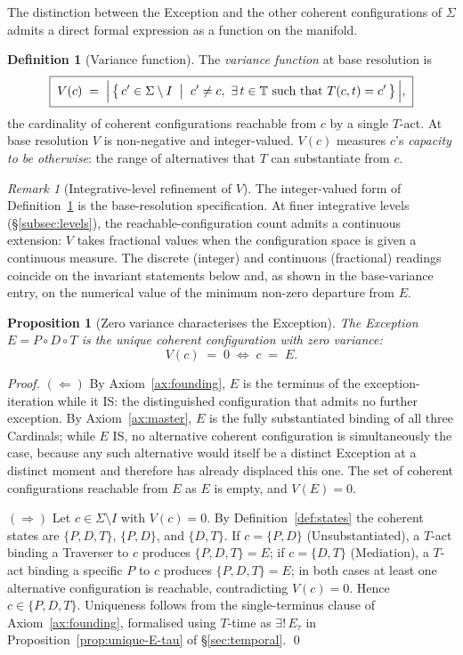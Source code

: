 \documentclass[11pt,a4paper]{article}
\newtheorem{proposition}[theorem]{Proposition}
\theoremstyle{definition}
\newtheorem{definition}[theorem]{Definition}
\theoremstyle{remark}
\newtheorem{remark}[theorem]{Remark}
\newcommand{\PDT}{\ensuremath{P{\circ}D{\circ}T}}
\begin{document}
The distinction between the Exception and the other coherent configurations of $\Sigma$ admits a direct formal expression as a function on the manifold.

\begin{definition}[Variance function]\label{def:variance}
The \emph{variance function} at base resolution is
\[
\boxed{\;V(c) \;=\; \Bigl|\,\bigl\{\,c' \in \Sigma \setminus I \;\bigm|\; c' \ne c,\ \exists\,t \in \mathbb{T} \text{ such that } T(c,t) = c'\,\bigr\}\,\Bigr|,\;}
\]
the cardinality of coherent configurations reachable from $c$ by a single $T$-act. At base resolution $V$ is non-negative and integer-valued. $V(c)$ measures $c$'s \emph{capacity to be otherwise}: the range of alternatives that $T$ can substantiate from $c$.
\end{definition}

\begin{remark}[Integrative-level refinement of $V$]\label{rem:V-levels}
The integer-valued form of Definition~\ref{def:variance} is the base-resolution specification. At finer integrative levels (\S\ref{subsec:levels}), the reachable-configuration count admits a continuous extension: $V$ takes fractional values when the configuration space is given a continuous measure. The discrete (integer) and continuous (fractional) readings coincide on the invariant statements below and, as shown in the base-variance entry, on the numerical value of the minimum non-zero departure from $E$.
\end{remark}

\begin{proposition}[Zero variance characterises the Exception]\label{prop:zero-variance}
The Exception $E = \PDT$ is the unique coherent configuration with zero variance:
\[
V(c) \;=\; 0 \;\iff\; c \;=\; E.
\]
\end{proposition}

\begin{proof}
$(\Leftarrow)$ By Axiom~\ref{ax:founding}, $E$ is the terminus of the exception-iteration while it IS: the distinguished configuration that admits no further exception. By Axiom~\ref{ax:master}, $E$ is the fully substantiated binding of all three Cardinals; while $E$ IS, no alternative coherent configuration is simultaneously the case, because any such alternative would itself be a distinct Exception at a distinct moment and therefore has already displaced this one. The set of coherent configurations reachable from $E$ as $E$ is empty, and $V(E) = 0$.

$(\Rightarrow)$ Let $c \in \Sigma\setminus I$ with $V(c) = 0$. By Definition~\ref{def:states} the coherent states are $\{P,D,T\}$, $\{P,D\}$, and $\{D,T\}$. If $c = \{P,D\}$ (Unsubstantiated), a $T$-act binding a Traverser to $c$ produces $\{P,D,T\} = E$; if $c = \{D,T\}$ (Mediation), a $T$-act binding a specific $P$ to $c$ produces $\{P,D,T\} = E$; in both cases at least one alternative configuration is reachable, contradicting $V(c)=0$. Hence $c \in \{P,D,T\}$. Uniqueness follows from the single-terminus clause of Axiom~\ref{ax:founding}, formalised using $T$-time as $\exists!\,E_\tau$ in Proposition~\ref{prop:unique-E-tau} of \S\ref{sec:temporal}. \qed
\end{proof}
\end{document}
